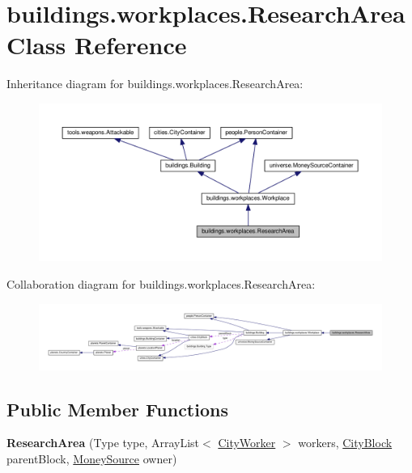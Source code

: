 \hypertarget{classbuildings_1_1workplaces_1_1_research_area}{}\section{buildings.\+workplaces.\+Research\+Area Class Reference}
\label{classbuildings_1_1workplaces_1_1_research_area}


Inheritance diagram for buildings.\+workplaces.\+Research\+Area\+:\nopagebreak
\begin{figure}[H]
\begin{center}
\leavevmode
\includegraphics[width=350pt]{classbuildings_1_1workplaces_1_1_research_area__inherit__graph}
\end{center}
\end{figure}


Collaboration diagram for buildings.\+workplaces.\+Research\+Area\+:\nopagebreak
\begin{figure}[H]
\begin{center}
\leavevmode
\includegraphics[width=350pt]{classbuildings_1_1workplaces_1_1_research_area__coll__graph}
\end{center}
\end{figure}
\subsection*{Public Member Functions}
\begin{DoxyCompactItemize}
\item 
{\bfseries Research\+Area} (Type type, Array\+List$<$ \hyperlink{classpeople_1_1cityworkers_1_1_city_worker}{City\+Worker} $>$ workers, \hyperlink{classcities_1_1_city_block}{City\+Block} parent\+Block, \hyperlink{classuniverse_1_1_money_source}{Money\+Source} owner)\hypertarget{classbuildings_1_1workplaces_1_1_research_area_a5b2d1ad94f2b84e1b92a301e8c62bd50}{}\label{classbuildings_1_1workplaces_1_1_research_area_a5b2d1ad94f2b84e1b92a301e8c62bd50}

\end{DoxyCompactItemize}
